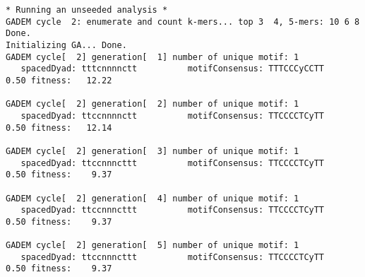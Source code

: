 \begin{lstlisting}
* Running an unseeded analysis *
GADEM cycle  2: enumerate and count k-mers... top 3  4, 5-mers: 10 6 8
Done.
Initializing GA... Done.
GADEM cycle[  2] generation[  1] number of unique motif: 1
   spacedDyad: tttcnnnnctt          motifConsensus: TTTCCCyCCTT           0.50 fitness:   12.22

GADEM cycle[  2] generation[  2] number of unique motif: 1
   spacedDyad: ttccnnnnctt          motifConsensus: TTCCCCTCyTT           0.50 fitness:   12.14

GADEM cycle[  2] generation[  3] number of unique motif: 1
   spacedDyad: ttccnnncttt          motifConsensus: TTCCCCTCyTT           0.50 fitness:    9.37

GADEM cycle[  2] generation[  4] number of unique motif: 1
   spacedDyad: ttccnnncttt          motifConsensus: TTCCCCTCyTT           0.50 fitness:    9.37

GADEM cycle[  2] generation[  5] number of unique motif: 1
   spacedDyad: ttccnnncttt          motifConsensus: TTCCCCTCyTT           0.50 fitness:    9.37
    
\end{lstlisting}
